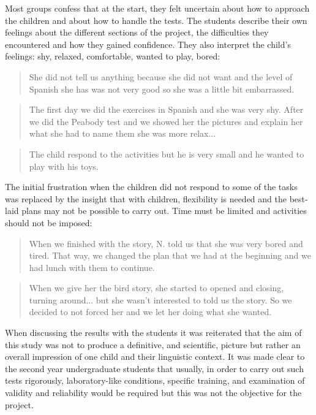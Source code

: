 \documentclass[output=paper]{../langscibook}
\begin{document}
Most groups confess that at the start, they felt uncertain about how to approach the children and about how to handle the tests. The students describe their own feelings about the different sections of the project, the difficulties they encountered and how they gained confidence. They also interpret the child’s feelings: shy, relaxed, comfortable, wanted to play, bored:

\begin{quote}
She did not tell us anything because she did not want and the level of Spanish she has was not very good so she was a little bit embarrassed.
\end{quote}

\begin{quote}
The first day we did the exercises in Spanish and she was very shy. After we did the Peabody test and we showed her the pictures and explain her what she had to name them she was more relax... 
\end{quote}

\begin{quote}
The child respond to the activities but he is very small and he wanted to play with his toys.
\end{quote}

The initial frustration when the children did not respond to some of the tasks was replaced by the insight that with children, flexibility is needed and the best-laid plans may not be possible to carry out. Time must be limited and activities should not be imposed:

\begin{quote}
When we finished with the story, N. told us that she was very bored and tired. That way, we changed the plan that we had at the beginning and we had lunch with them to continue.
\end{quote}

\begin{quote}
When we give her the bird story, she started to opened and closing, turning around... but she wasn’t interested to told us the story. So we decided to not forced her and we let her doing what she wanted.
\end{quote}

When discussing the results with the students it was reiterated that the aim of this study was not to produce a definitive, and scientific, picture but rather an overall impression of one child and their linguistic context. It was made clear to the second year undergraduate students that usually, in order to carry out such tests rigorously, laboratory-like conditions, specific training, and examination of validity and reliability would be required but this was not the objective for the project.
\end{document}
